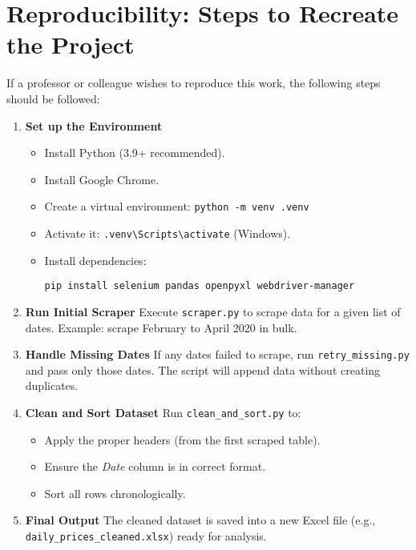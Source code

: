 \documentclass[12pt]{article}
\begin{document}
\section*{Reproducibility: Steps to Recreate the Project}
If a professor or colleague wishes to reproduce this work, the following steps should be followed:

\begin{enumerate}[label=\textbf{Step \arabic*:}, leftmargin=*]
    \item \textbf{Set up the Environment}  
    \begin{itemize}
        \item Install Python (3.9+ recommended).  
        \item Install Google Chrome.  
        \item Create a virtual environment: \texttt{python -m venv .venv}  
        \item Activate it: \verb|.venv\Scripts\activate| (Windows).  
        \item Install dependencies:  
        \begin{verbatim}
pip install selenium pandas openpyxl webdriver-manager
        \end{verbatim}
    \end{itemize}

    \item \textbf{Run Initial Scraper}  
    Execute \texttt{scraper.py} to scrape data for a given list of dates.  
    Example: scrape February to April 2020 in bulk.

    \item \textbf{Handle Missing Dates}  
    If any dates failed to scrape, run \texttt{retry\_missing.py} and pass only those dates.  
    The script will append data without creating duplicates.

    \item \textbf{Clean and Sort Dataset}  
    Run \texttt{clean\_and\_sort.py} to:
    \begin{itemize}
        \item Apply the proper headers (from the first scraped table).
        \item Ensure the \emph{Date} column is in correct format.
        \item Sort all rows chronologically.
    \end{itemize}

    \item \textbf{Final Output}  
    The cleaned dataset is saved into a new Excel file (e.g., \texttt{daily\_prices\_cleaned.xlsx}) 
    ready for analysis.
\end{enumerate}
\end{document}
